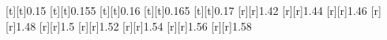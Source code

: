 %    
%
%
\begin{psfrags}%
\psfragscanon%
%
[t][t]{0.15}%
[t][t]{0.155}%
[t][t]{0.16}%
[t][t]{0.165}%
[t][t]{0.17}%
%
[r][r]{1.42}%
[r][r]{1.44}%
[r][r]{1.46}%
[r][r]{1.48}%
[r][r]{1.5}%
[r][r]{1.52}%
[r][r]{1.54}%
[r][r]{1.56}%
[r][r]{1.58}%
%
%
\end{psfrags}%
%
